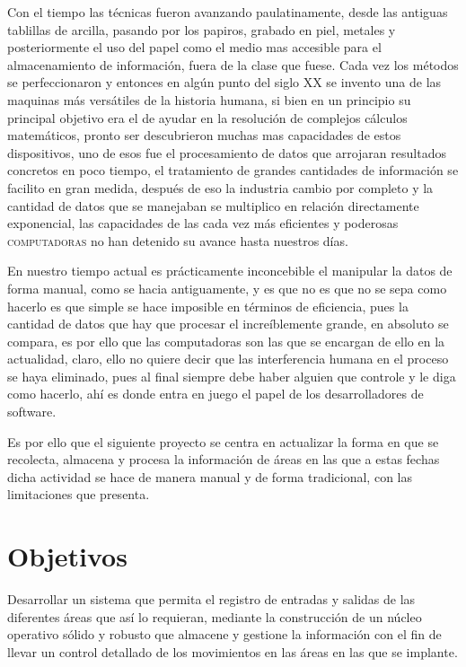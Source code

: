 \documentclass[12pt]{article} %
\begin{document}
	Con el tiempo las t\'ecnicas fueron avanzando paulatinamente, desde las antiguas tablillas de arcilla, pasando por los papiros, grabado en piel, metales y posteriormente
	el uso del papel como el medio mas accesible para el almacenamiento de información, fuera de la clase que fuese. Cada vez los m\'etodos se perfeccionaron y entonces en 
	algún punto del siglo \textsc{XX} se invento una de las maquinas m\'as versátiles de la historia humana, si bien en un principio su principal objetivo era el de ayudar en
	la resolución de complejos cálculos matemáticos, pronto ser descubrieron muchas mas capacidades de estos dispositivos, uno de esos fue el procesamiento de datos que 
	arrojaran resultados concretos en poco tiempo, el tratamiento de grandes cantidades de información se facilito en gran medida, después de eso la industria cambio por 
	completo y la cantidad de datos que se manejaban se multiplico en relación directamente exponencial, las capacidades de las cada vez m\'as eficientes y poderosas
	\textsc{computadoras} no han detenido su avance hasta nuestros días.
	
	En nuestro tiempo actual es prácticamente inconcebible el manipular la datos de forma manual, como se hacia antiguamente, y es que no es que no se sepa como hacerlo es que
	simple se hace imposible en términos de eficiencia, pues la cantidad de datos que hay que procesar el increíblemente grande, en absoluto se compara, es por ello que las 
	computadoras son las que se encargan de ello en la actualidad, claro, ello no quiere decir que las interferencia humana en el proceso se haya eliminado, pues al final 
 	siempre	debe haber alguien que controle y le diga como hacerlo, ah\'i es donde entra en juego el papel de los desarrolladores de software.
 	
 	Es por ello que el siguiente proyecto se centra en actualizar la forma en que se recolecta, almacena y procesa la información de áreas en las que a estas fechas dicha
 	actividad se hace de manera manual y de forma tradicional, con las limitaciones que presenta.
	
\newpage	
\section{Objetivos}

		Desarrollar un sistema que permita el registro de entradas y salidas de las diferentes áreas que así lo requieran, mediante la construcción de un núcleo operativo sólido
		y robusto que almacene y gestione la información con el fin de llevar un control detallado de los movimientos en las áreas en las que se implante.
	
\end{document}

